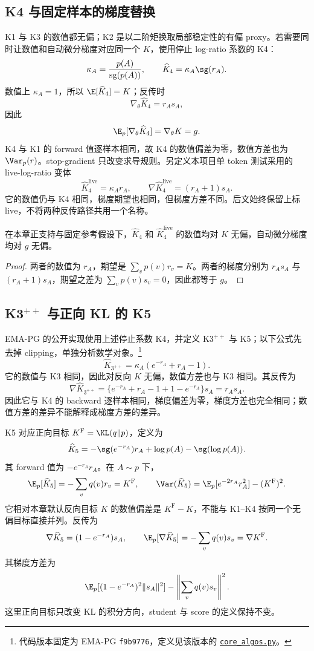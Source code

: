 \subsection{K4 与固定样本的梯度替换}
K1 与 K3 的数值都无偏；K2 是以二阶矩换取局部稳定性的有偏 proxy。若需要同时让数值和自动微分梯度对应同一个 $K$，使用停止 log-ratio 系数的 K4：
\[
 \kappa_A=\frac{p(A)}{\operatorname{sg}(p(A))},\qquad
 \widehat K_4=\kappa_A\sg(r_A).
\]
数值上 $\kappa_A=1$，所以 $\E[\widehat K_4]=K$；反传时
\[
 \nabla_\theta\widehat K_4=r_As_A,
\]
因此
\[
 \E_p[\nabla_\theta\widehat K_4]=\nabla_\theta K=g.
\]
K4 与 K1 的 forward 值逐样本相同，故 K4 的数值偏差为零，数值方差也为 $\Var_p(r)$。stop-gradient 只改变求导规则。另定义本项目单 token 测试采用的 live-log-ratio 变体
\[
 \widehat K_4^{\mathrm{live}}=\kappa_A r_A,\qquad
 \nabla\widehat K_4^{\mathrm{live}}=(r_A+1)s_A.
\]
它的数值仍与 K4 相同，梯度期望也相同，但梯度方差不同。后文始终保留上标 $\mathrm{live}$，不将两种反传路径共用一个名称。

\begin{theorem}[K4 的数值与梯度无偏性]
\label{thm:k4}
在本章正支持与固定参考假设下，$\widehat K_4$ 和 $\widehat K_4^{\mathrm{live}}$ 的数值均对 $K$ 无偏，自动微分梯度均对 $g$ 无偏。
\end{theorem}
\begin{proof}
两者的数值为 $r_A$，期望是 $\sum_vp(v)r_v=K$。两者的梯度分别为 $r_As_A$ 与 $(r_A+1)s_A$，期望之差为 $\sum_vp(v)s_v=0$，因此都等于 $g$。
\end{proof}

\subsection{K3$^{++}$ 与正向 KL 的 K5}

EMA-PG 的公开实现使用上述停止系数 K4，并定义 K3$^{++}$ 与 K5；以下公式先去掉 clipping，单独分析数学对象。\footnote{代码版本固定为 EMA-PG \texttt{f9b9776}，定义见该版本的 \href{https://github.com/LunjunZhang/ema-pg/blob/f9b977632ad948ce935432a517c22291bfaba562/search/verl/trainer/ppo/core_algos.py}{\texttt{core\_algos.py}}。}
\[
 \widehat K_{3^{++}}=\kappa_A(e^{-r_A}+r_A-1).
\]
它的数值与 K3 相同，因此对反向 $K$ 无偏，数值方差也与 K3 相同。其反传为
\[
 \nabla\widehat K_{3^{++}}
 =\{e^{-r_A}+r_A-1+1-e^{-r_A}\}s_A=r_As_A.
\]
因此它与 K4 的 backward 逐样本相同，梯度偏差为零，梯度方差也完全相同；数值方差的差异不能解释成梯度方差的差异。

K5 对应正向目标 $K^{\mathrm F}=\KL(q\Vert p)$，定义为
\[
 \widehat K_5=-\sg(e^{-r_A})r_A+\log p(A)-\sg(\log p(A)).
\]
其 forward 值为 $-e^{-r_A}r_A$。在 $A\sim p$ 下，
\[
 \E_p[\widehat K_5]=-\sum_vq(v)r_v=K^{\mathrm F},\qquad
 \Var(\widehat K_5)=\E_p[e^{-2r_A}r_A^2]-(K^{\mathrm F})^2.
\]
它相对本章默认反向目标 $K$ 的数值偏差是 $K^{\mathrm F}-K$，不能与 K1--K4 按同一个无偏目标直接并列。反传为
\[
 \nabla\widehat K_5=(1-e^{-r_A})s_A,\qquad
 \E_p[\nabla\widehat K_5]=-\sum_vq(v)s_v=\nabla K^{\mathrm F}.
\]
其梯度方差为
\[
 \E_p[(1-e^{-r_A})^2\lVert s_A\rVert^2]
 -\left\lVert\sum_vq(v)s_v\right\rVert^2.
\]
这里正向目标只改变 KL 的积分方向，student 与 score 的定义保持不变。

